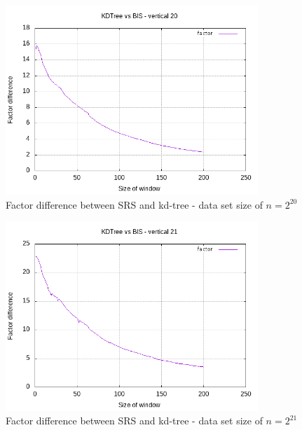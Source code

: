 \begin{figure}[h]
    \centering
    \includegraphics[width = 0.85\textwidth]{pictures/analysis/smalls/vert_fac_20.png}
    \caption{Factor difference between SRS and kd-tree - data set size of $n=2^{20}$}\label{fig:small_vert_fac_20}
\end{figure}

\begin{figure}[h]
    \centering
    \includegraphics[width = 0.85\textwidth]{pictures/analysis/smalls/vert_fac_21.png}
    \caption{Factor difference between SRS and kd-tree - data set size of $n=2^{21}$}\label{fig:small_vert_fac_21}
\end{figure}

